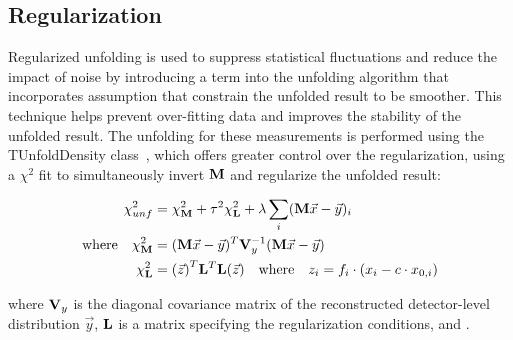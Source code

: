 \subsection{Regularization}
\label{Regularization}
Regularized unfolding is used to suppress statistical fluctuations and reduce the impact of noise by introducing a term into the unfolding algorithm that incorporates assumption that constrain the unfolded result to be smoother.
This technique helps prevent over-fitting data and improves the stability of the unfolded result.
The unfolding for these measurements is performed using the TUnfoldDensity class~\cite{TUnfold}, which offers greater control over the regularization, using a $\chi^{2}$ fit to simultaneously invert $\mathbf{M}$ and regularize the unfolded result:
\begin{linenomath*}
\begin{align}
\chi^{2}_{unf}&=\chi^{2}_{\mathbf{M}}+\tau^{2}\chi^{2}_{\mathbf{L}}+\lambda\sum_{i}(\mathbf{M}\vec{x}-\vec{y})_{i} \\
\mathrm{where \quad} \chi^{2}_{\mathbf{M}}&=(\mathbf{M}\vec{x}-\vec{y})^{T}\mathbf{V}_{y}^{-1}(\mathbf{M}\vec{x}-\vec{y}) \\
\chi^{2}_{\mathbf{L}}&={(\vec{z})}^{T}\mathbf{L}^{T}\mathbf{L}{(\vec{z})} \quad \text{where} \quad z_i = f_i \cdot (x_i - c \cdot x_{0,i})
\label{eq:Chi2TUnfold}
\end{align}
\end{linenomath*}
where $\mathbf{V}_{y}$ is the diagonal covariance matrix of the reconstructed detector-level distribution $\vec{y}$, $\mathbf{L}$ is a matrix specifying the regularization conditions, and .

